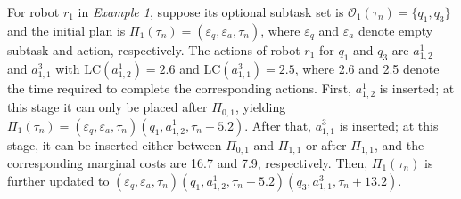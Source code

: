 \documentclass[lettersize,journal]{IEEEtran}
\begin{document}
\begin{example}
For robot $r_1$ in \textit{Example 1}, suppose its optional subtask set is $\mathcal{O}_1(\tau_n) = \{q_1, q_3\}$ and the initial plan is $\Pi_1(\tau_n) = (\varepsilon_q, \varepsilon_a, \tau_n)$, where $\varepsilon_q$ and $\varepsilon_a$ denote empty subtask and action, respectively. The actions of robot $r_1$ for $q_1$ and $q_3$ are $a^1_{1,2}$ and $a^3_{1,1}$ with $\mathrm{LC}(a^1_{1,2})=2.6$ and $\mathrm{LC}(a^3_{1,1})=2.5$, where 2.6 and 2.5 denote the time required to complete the corresponding actions.   First, $a^1_{1,2}$ is inserted; at this stage it can only be placed after $\Pi_{0,1}$, yielding $\Pi_1(\tau_n)=(\varepsilon_q, \varepsilon_a, \tau_n)(q_1, a^1_{1,2}, \tau_n + 5.2)$. After that, $a^3_{1,1}$ is inserted; at this stage, it can be inserted either between $\Pi_{0,1}$ and $\Pi_{1,1}$ or after $\Pi_{1,1}$, and the corresponding marginal costs are 16.7 and 7.9, respectively. Then, $\Pi_1(\tau_n)$ is further updated to $(\varepsilon_q, \varepsilon_a, \tau_n)(q_1, a^1_{1,2}, \tau_n + 5.2)(q_3, a^3_{1,1}, \tau_n + 13.2)$.
\end{example}
\end{document}
